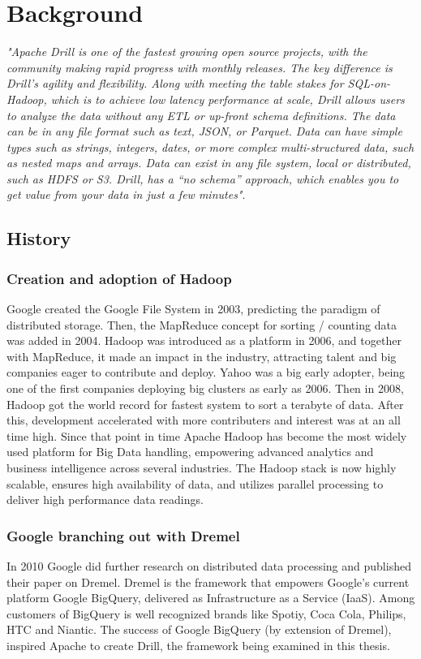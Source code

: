 \documentclass[a4paper,english]{report}
\begin{document}
	\chapter{Background}
	\emph{"Apache Drill is one of the fastest growing open source projects, with the community making rapid progress with monthly releases. The key difference is Drill’s agility and flexibility. Along with meeting the table stakes for SQL-on-Hadoop, which is to achieve low latency performance at scale, Drill allows users to analyze the data without any ETL or up-front schema definitions. The data can be in any file format such as text, JSON, or Parquet. Data can have simple types such as strings, integers, dates, or more complex multi-structured data, such as nested maps and arrays. Data can exist in any file system, local or distributed, such as HDFS or S3. Drill, has a “no schema” approach, which enables you to get value from your data in just a few minutes"}\cite{drill}.
	
	\section{History}
		\subsection{Creation and adoption of Hadoop}
		Google created the Google File System in 2003\cite{gfs}, predicting the paradigm of distributed storage. Then, the MapReduce concept for sorting / counting data was added in 2004\cite{mapredoriginal}. Hadoop was introduced as a platform in 2006\cite{hadoopguide}, and together with MapReduce, it made an impact in the industry, attracting talent and big companies eager to contribute and deploy. Yahoo was a big early adopter, being one of the first companies deploying big clusters as early as 2006\cite{hadoopguide}. Then in 2008, Hadoop got the world record for fastest system to sort a terabyte of data\cite{hadoopguide}. After this, development accelerated with more contributers and interest was at an all time high. Since that point in time Apache Hadoop has become the most widely used platform for Big Data handling, empowering advanced analytics and business intelligence across several industries. The Hadoop stack is now highly scalable, ensures high availability of data, and utilizes parallel processing to deliver high performance data readings.
		
		\subsection{Google branching out with Dremel}
		In 2010 Google did further research on distributed data processing and published their paper on Dremel\cite{dremel}. Dremel is the framework that empowers Google's current platform Google BigQuery, delivered as Infrastructure as a Service (IaaS). Among customers of BigQuery is well recognized brands like Spotiy, Coca Cola, Philips, HTC and Niantic\cite{dremelcustomers}. The success of Google BigQuery (by extension of Dremel), inspired Apache to create Drill, the framework being examined in this thesis.
	
\end{document}
